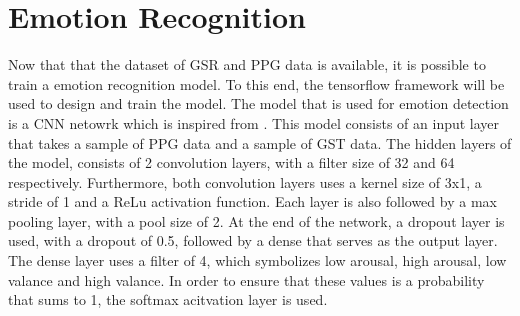 \chapter{Emotion Recognition}
Now that that the dataset of GSR and PPG data is available, it is possible to train a emotion recognition model. To this end, the tensorflow framework will be used to design and train the model. The model that is used for emotion detection is a CNN netowrk which is inspired from \cite{PPG_EMG_CNN}. This model consists of an input layer that takes a sample of PPG data and a sample of GST data. The hidden layers of the model, consists of 2 convolution layers, with a filter size of 32 and 64 respectively. Furthermore, both convolution layers uses a kernel size of 3x1, a stride of 1 and a ReLu activation function. Each layer is also followed by a max pooling layer, with a pool size of 2. At the end of the network, a dropout layer is used, with a dropout of 0.5, followed by a dense that serves as the output layer. The dense layer uses a filter of 4, which symbolizes low arousal, high arousal, low valance and high valance. In order to ensure that these values is a probability that sums to 1, the softmax acitvation layer is used.  





